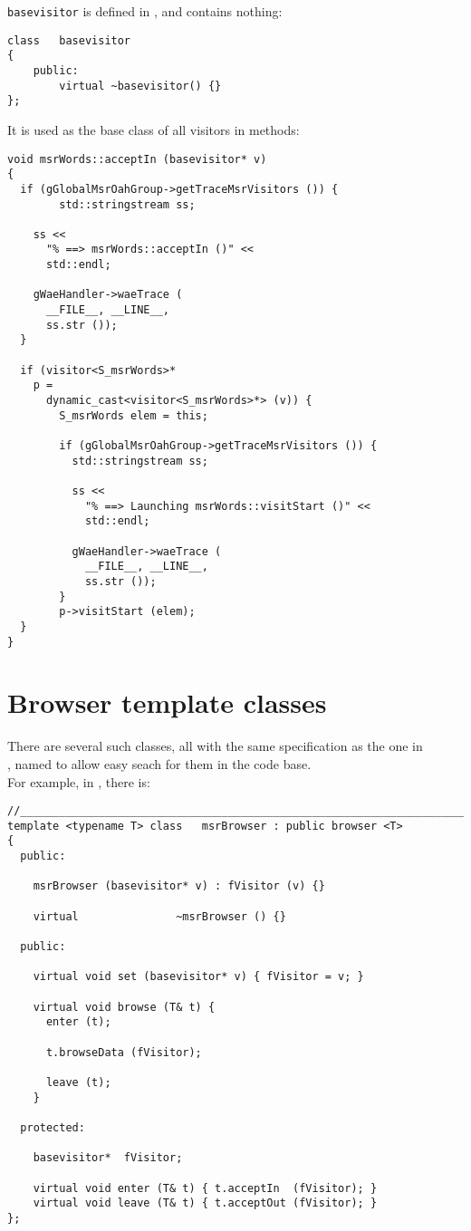 {\tt basevisitor} is defined in , and contains nothing:
\begin{lstlisting}[language=CPlusPlus]
class   basevisitor
{
	public:
		virtual ~basevisitor() {}
};
\end{lstlisting}

It is used as the base class   of all visitors in  methods:
\begin{lstlisting}[language=CPlusPlus]
void msrWords::acceptIn (basevisitor* v)
{
  if (gGlobalMsrOahGroup->getTraceMsrVisitors ()) {
		std::stringstream ss;

    ss <<
      "% ==> msrWords::acceptIn ()" <<
      std::endl;

    gWaeHandler->waeTrace (
      __FILE__, __LINE__,
      ss.str ());
  }

  if (visitor<S_msrWords>*
    p =
      dynamic_cast<visitor<S_msrWords>*> (v)) {
        S_msrWords elem = this;

        if (gGlobalMsrOahGroup->getTraceMsrVisitors ()) {
          std::stringstream ss;

          ss <<
            "% ==> Launching msrWords::visitStart ()" <<
            std::endl;

          gWaeHandler->waeTrace (
            __FILE__, __LINE__,
            ss.str ());
        }
        p->visitStart (elem);
  }
}
\end{lstlisting}


\section{Browser template classes}

There are several such classes, all with the same specification as the one in\\
, named to allow easy seach for them in the code base.\\
For example, in , there is:
\begin{lstlisting}[language=CPlusPlus]
//______________________________________________________________________________
template <typename T> class   msrBrowser : public browser <T>
{
  public:

    msrBrowser (basevisitor* v) : fVisitor (v) {}

    virtual               ~msrBrowser () {}

  public:

    virtual void set (basevisitor* v) { fVisitor = v; }

    virtual void browse (T& t) {
      enter (t);

      t.browseData (fVisitor);

      leave (t);
    }

  protected:

    basevisitor*  fVisitor;

    virtual void enter (T& t) { t.acceptIn  (fVisitor); }
    virtual void leave (T& t) { t.acceptOut (fVisitor); }
};
\end{lstlisting}



